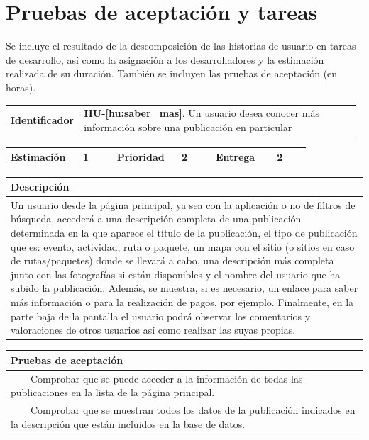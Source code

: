 \documentclass[11pt]{article}
\newcommand{\tabitem}{~~\llap{\textbullet}~~}
\begin{document}
\section{Pruebas de aceptación y tareas}
Se incluye el resultado de la descomposición de las historias de usuario en tareas de desarrollo, así como la asignación a los desarrolladores y la estimación realizada de su duración. También se incluyen las pruebas de aceptación (en horas).

\begin{longtable}{p{0.18\linewidth}|p{0.8\linewidth}}
  \rowcolor{LightCyan}
  \textbf{Identificador} & \textbf{HU-\ref{hu:saber_mas}}. Un usuario desea conocer más información sobre una publicación en particular\\  
\end{longtable}
\vspace{-0.8cm}
\begin{longtable}{p{0.18\linewidth}|p{0.1\linewidth}|p{0.18\linewidth}|p{0.1\linewidth}|p{0.18\linewidth}|p{0.1\linewidth}}
  \toprule
  \textbf{Estimación} & 1 & \textbf{Prioridad} & 2 & \textbf{Entrega} & 2 \\
  \bottomrule
\end{longtable}
\vspace{-0.8cm}
\begin{longtable}{p{1.028\linewidth}}
  \textbf{Descripción}\\
  \midrule
  Un usuario desde la página principal, ya sea con la aplicación o no de filtros de búsqueda, accederá a una descripción completa de una publicación determinada en la que aparece el título de la publicación, el tipo de publicación que es: evento, actividad, ruta o paquete, un mapa con el sitio (o sitios en caso de rutas/paquetes) donde se llevará a cabo, una descripción más completa junto con las fotografías si están disponibles y el nombre del usuario que ha subido la publicación. Además, se muestra, si es necesario, un enlace para saber más información o para la realización de pagos, por ejemplo.
  Finalmente, en la parte baja de la pantalla el usuario podrá observar los comentarios y valoraciones de otros usuarios así como realizar las suyas propias.
  \\
  \bottomrule
\end{longtable}
\vspace{-0.8cm}
\begin{longtable}{p{1.028\linewidth}}
  \textbf{Pruebas de aceptación}\\
  \midrule
  \tabitem Comprobar que se puede acceder a la información de todas las publicaciones en la lista de la página principal.\\
  \tabitem Comprobar que se muestran todos los datos de la publicación indicados en la descripción que están incluidos en la base de datos.\\
\end{longtable}
\end{document}

